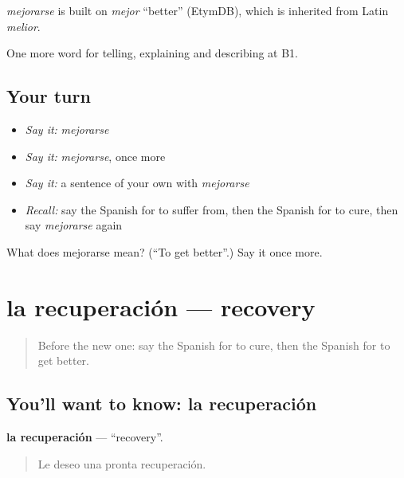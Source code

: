 \begin{cousinweb}
\emph{mejorarse} is built on \emph{mejor} \textquotedblleft{}better\textquotedblright{} (EtymDB), which is inherited from Latin \emph{melior}.
\end{cousinweb}

\begin{grammarlens}[title={What you've built}]
One more word for telling, explaining and describing at B1.
\end{grammarlens}

\subsection*{Your turn}
\begin{itemize}
\raggedright
  \item \emph{Say it:} \emph{mejorarse}
  \item \emph{Say it:} \emph{mejorarse}, once more
  \item \emph{Say it:} a sentence of your own with \emph{mejorarse}
  \item \emph{Recall:} say the Spanish for to suffer from, then the Spanish for to cure, then say \emph{mejorarse} again
\end{itemize}

\begin{tcolorbox}[breakable,colback=teal!4,colframe=teal!35!black,title={Before you move on}]
What does mejorarse mean? (\textquotedblleft{}To get better\textquotedblright{}.) Say it once more.
\end{tcolorbox}
\section[la recuperación]{la recuperación — recovery}

\label{lesson:ES-C739-recuperacion}



\begin{quote}
Before the new one: say the Spanish for to cure, then the Spanish for to get better.
\end{quote}

\subsection*{You'll want to know: la recuperación}
\textbf{la recuperación} — \textquotedblleft{}recovery\textquotedblright{}.

\begin{quote}
Le deseo una pronta recuperación.
\end{quote}

